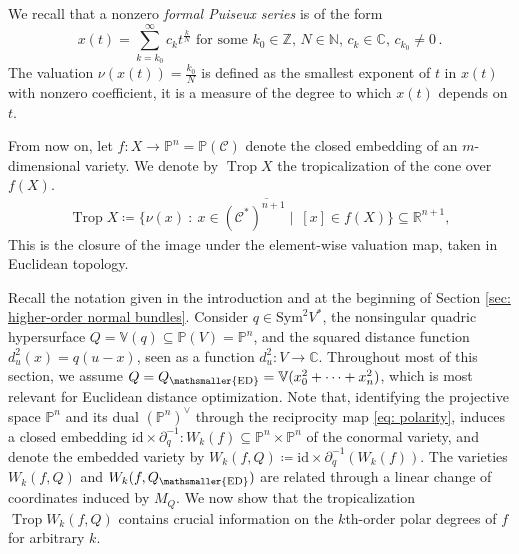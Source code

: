 \documentclass[11pt,reqno]{amsart}
\numberwithin{equation}{section}
\theoremstyle{plain}
\numberwithin{theorem}{section}
\theoremstyle{definition}
\newcommand{\N}{\mathbb{N}}
\renewcommand{\P}{\mathbb{P}}
\newcommand{\Z}{\mathbb{Z}}
\newcommand{\R}{\mathbb{R}}
\newcommand{\C}{\mathbb{C}}
\newcommand{\V}{\mathbb{V}}
\newcommand{\CC}{\mathcal{C}}
\DeclareMathOperator{\Trop}{Trop}
\newcommand{\mED}{\mathsmaller{\mathrm{ED}}}
\begin{document}
We recall that a nonzero {\em formal Puiseux series} is of the form
\[
x(t)=\sum_{k=k_0}^{\infty} c_k t^{\frac{k}{N}} \text { for some } k_0 \in \Z,\, N \in \N,\, c_k \in \C, \, c_{k_0} \neq 0\,.
\]
The valuation $\nu(x(t))= \frac{k_0}{N}$ is defined as the smallest exponent of $t$ in $x(t)$ with nonzero coefficient, it is a measure of the degree to which $x(t)$ depends on $t$.

From now on, let $f\colon X \to \P^n = \P(\CC)$ denote the closed embedding of an $m$-dimensional variety.
We denote by $\Trop X$ the tropicalization of the cone over $f(X)$.
\begin{align*}
\Trop X \coloneqq \overline{\{ \nu( x) \ \colon \  x \in (\CC^*)^{n+1} \mid \ [x] \in f(X)  \}} \subseteq \R^{n+1},
\end{align*}
This is the closure of the image under the element-wise valuation map, taken in Euclidean topology.

Recall the notation given in the introduction and at the beginning of Section \ref{sec: higher-order normal bundles}. Consider $q\in\mathrm{Sym}^2V^*$, the nonsingular quadric hypersurface $Q = \V(q)\subseteq\P(V)=\P^n$, and the squared distance function $d_u^2(x) = q(u-x)$, seen as a function $d_u^2\colon V\to\C$.
Throughout most of this section, we assume $Q=Q_\mED = \V(x_0^2 + \cdots + x_n^2)$, which is most relevant for Euclidean distance optimization. 
Note that, identifying the projective space $\P^n$ and its dual $(\P^n)^\vee$ through the reciprocity map \eqref{eq: polarity}, induces a closed embedding $\mathrm{id} \times \partial_q^{-1} \colon W_k(f) \subseteq \P^n \times \P^n$ of the conormal variety, and denote the embedded variety by $W_k(f,Q) \coloneqq \mathrm{id} \times \partial_q^{-1} (W_k(f))$.
The varieties $W_k(f,Q)$ and $W_k(f,Q_\mED)$ are related through a linear change of coordinates induced by $M_Q$.
We now show that the tropicalization $\Trop W_k(f,Q)$ contains crucial information on the $ k$th-order polar degrees of $f$ for arbitrary $k$.
\end{document}
